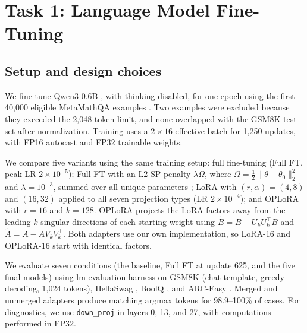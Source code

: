\documentclass{article}
\begin{document}
\section{Task 1: Language Model Fine-Tuning}
\label{sec:task1}

\subsection{Setup and design choices}

We fine-tune Qwen3-0.6B \citep{qwen3}, with thinking disabled, for one epoch using the first 40,000 eligible MetaMathQA examples \citep{metamath}. Two examples were excluded because they exceeded the 2,048-token limit, and none overlapped with the GSM8K test set after normalization. Training uses a $2\times16$ effective batch for 1,250 updates, with FP16 autocast and FP32 trainable weights.

We compare five variants using the same training setup: full fine-tuning (Full FT, peak LR $2\times10^{-5}$); Full FT with an L2-SP penalty $\lambda\Omega$, where $\Omega=\tfrac12\|\theta-\theta_0\|_2^2$ and $\lambda=10^{-3}$, summed over all unique parameters \citep{l2sp}; LoRA \citep{lora} with $(r,\alpha)=(4,8)$ and $(16,32)$ applied to all seven projection types (LR $2\times10^{-4}$); and OPLoRA \citep{oplora} with $r=16$ and $k=128$. OPLoRA projects the LoRA factors away from the leading $k$ singular directions of each starting weight using $\tilde B=B-U_kU_k^\top B$ and $\tilde A=A-AV_kV_k^\top$. Both adapters use our own implementation, so LoRA-16 and OPLoRA-16 start with identical factors.

We evaluate seven conditions (the baseline, Full FT at update 625, and the five final models) using lm-evaluation-harness \citep{lmeval} on GSM8K \citep{gsm8k} (chat template, greedy decoding, 1,024 tokens), HellaSwag \citep{hellaswag}, BoolQ \citep{boolq}, and ARC-Easy \citep{arc}. Merged and unmerged adapters produce matching argmax tokens for 98.9--100\% of cases. For diagnostics, we use \texttt{down\_proj} in layers 0, 13, and 27, with computations performed in FP32.
\end{document}

